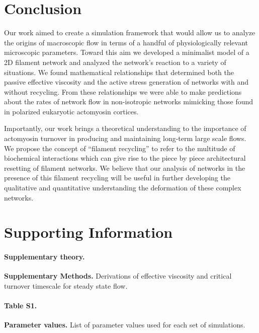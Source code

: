 \documentclass[10pt,letterpaper]{article}
\begin{document}
\section*{Conclusion}
Our work aimed to create a simulation framework that would allow us to analyze the origins of macroscopic flow in terms of a handful of physiologically relevant microscopic parameters.  Toward this aim we developed a minimalist model of a 2D filament network and analyzed the network's reaction to a variety of situations.  We found mathematical relationships that determined both the passive effective viscosity and the active stress generation of networks with and without recycling.  From these relationships we were able to make predictions about the rates of network flow in non-isotropic networks mimicking those found in polarized eukaryotic actomyosin cortices.  

Importantly, our work brings a theoretical understanding to the importance of actomyosin turnover in producing and maintaining long-term large scale flows.  We propose the concept of ``filament recycling'' to refer to the multitude of biochemical interactions which can give rise to the piece by piece architectural resetting of filament networks.  We believe that our analysis of networks in the presence of this filament recycling will be useful in further developing the qualitative and quantitative understanding the deformation of these complex networks.

\section*{Supporting Information}


\paragraph*{Supplementary theory.}
\label{S1_Text}
{\bf Supplementary Methods.} Derivations of effective viscosity and critical turnover timescale for steady state flow.

\paragraph*{Table S1.}
\label{S1_Table}
{\bf Parameter values.}  List of parameter values used for each set of simulations.
\end{document}
